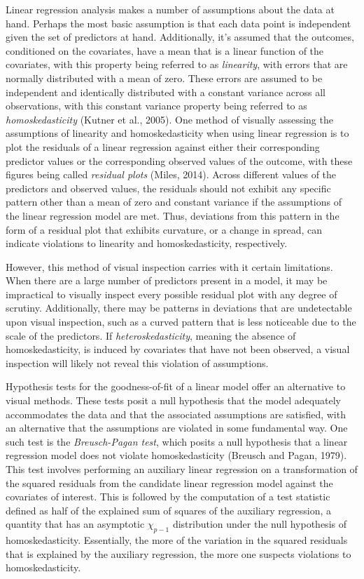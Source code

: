 		Linear regression analysis makes a number of assumptions about the data at hand. Perhaps the most basic assumption is that each data point is independent given the set of predictors at hand.
		Additionally, it's assumed that the outcomes, conditioned on the covariates, have a mean that is a linear function of the covariates, with this property being referred to as \textit{linearity},
		with errors that are normally distributed with a mean of zero. These errors are assumed to be independent and identically distributed with a constant variance across all observations, with this
		constant variance property being referred to as \textit{homoskedasticity} (Kutner et al., 2005). One method of visually assessing the assumptions of linearity and homoskedasticity when using linear
		regression is to plot the residuals of a linear regression against either their corresponding predictor values or the corresponding observed values of the outcome, with these figures being called \textit{residual plots} (Miles, 2014). Across different values
		of the predictors and observed values, the residuals should not exhibit any specific pattern other than a mean of zero and constant variance if the assumptions of the linear regression model are met.
		Thus, deviations from this pattern in the form of a residual plot that exhibits curvature, or a change in spread, can indicate violations
		to linearity and homoskedasticity, respectively.

		However, this method of visual inspection carries with it certain limitations. When there are a large number of predictors present in a model, it may be impractical to visually inspect every
		possible residual plot with any degree of scrutiny. Additionally, there may be patterns in deviations that are undetectable upon visual inspection, such as a curved pattern that is less noticeable
		due to the scale of the predictors. If \textit{heteroskedasticity}, meaning the absence of homoskedasticity, is induced by covariates that have not been observed, a visual inspection will likely
		not reveal this violation of assumptions.

		Hypothesis tests for the goodness-of-fit of a linear model offer an alternative to visual methods. These tests posit a null hypothesis that the model adequately accommodates the data and that
		the associated assumptions are satisfied, with an alternative that the assumptions are violated in some fundamental way. One such test is the \textit{Breusch-Pagan test}, which posits a null hypothesis
		that a linear regression model does not violate homoskedasticity (Breusch and Pagan, 1979). This test involves performing an auxiliary linear regression on a transformation of the squared residuals from
		the candidate linear regression model against the covariates of interest. This is followed by the computation of a test statistic defined as half of the explained sum of squares of the auxiliary
		regression, a quantity that has an asymptotic $\chi_{p-1}$ distribution under the null hypothesis of homoskedasticity. Essentially, the more of the variation in the squared residuals that is explained
		by the auxiliary regression, the more one suspects violations to homoskedasticity.

